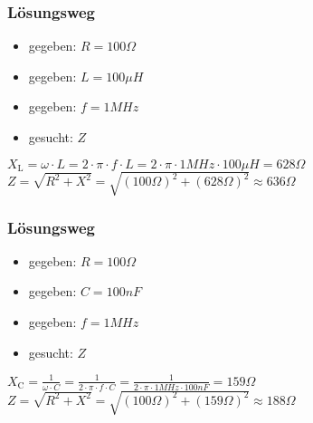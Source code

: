 \begin{frame}
\frametitle{Lösungsweg}
\begin{itemize}
  \item gegeben: $R = 100\Omega$
  \item gegeben: $L = 100\mu H$
  \item gegeben: $f = 1MHz$
  \item gesucht: $Z$
  \end{itemize}
    \pause
    $X_{\textrm{L}} = \omega \cdot L = 2 \cdot \pi \cdot f \cdot L = 2 \cdot \pi \cdot 1MHz \cdot 100\mu H = 628\Omega$
    \pause
    $Z = \sqrt{R^2 + X^2} = \sqrt{(100\Omega)^2 + (628\Omega)^2} \approx 636\Omega$



\end{frame}

\begin{frame}
\end{frame}

\begin{frame}
\frametitle{Lösungsweg}
\begin{itemize}
  \item gegeben: $R = 100\Omega$
  \item gegeben: $C = 100nF$
  \item gegeben: $f = 1MHz$
  \item gesucht: $Z$
  \end{itemize}
    \pause
    $X_{\textrm{C}} = \frac{1}{\omega \cdot C} = \frac{1}{2 \cdot \pi \cdot f \cdot C} = \frac{1}{2 \cdot \pi \cdot 1MHz \cdot 100nF} = 159\Omega$
    \pause
    $Z = \sqrt{R^2 + X^2} = \sqrt{(100\Omega)^2 + (159\Omega)^2} \approx 188\Omega$



\end{frame}%
